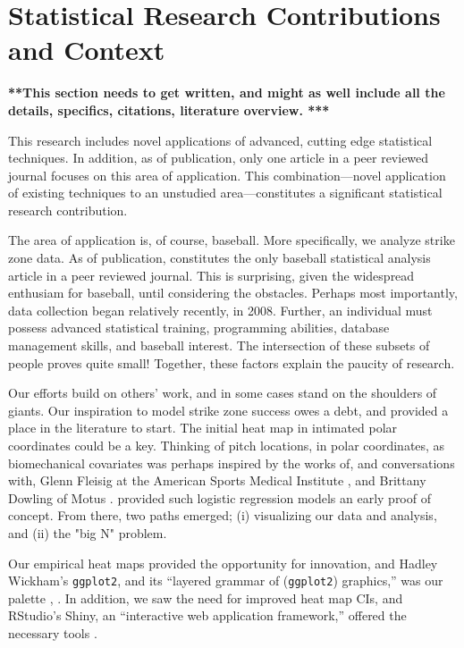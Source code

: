 \section{Statistical Research Contributions and Context}

{\bf ***This section needs to get written, and might as well include all the details, specifics, citations, literature overview. ***}

This research includes novel applications of advanced, cutting edge statistical techniques. In addition, as of publication, only one article in a peer reviewed journal focuses on this area of application. This combination---novel application of existing techniques to an unstudied area---constitutes a significant statistical research contribution. 

The area of application is, of course, baseball. More specifically, we analyze strike zone data. As of publication, \cite{Cross2015} constitutes the only baseball statistical analysis article in a peer reviewed journal. This is surprising, given the widespread enthusiam for baseball, until considering the obstacles. Perhaps most importantly, data collection began relatively recently, in 2008. Further, an individual must possess advanced statistical training, programming abilities, database management skills, and baseball interest. The intersection of these subsets of people proves quite small!  Together, these factors explain the paucity of research.

Our efforts build on others' work, and in some cases stand on the shoulders of giants. Our inspiration to model strike zone success owes \cite{Williams1971} a debt, and \cite{Cross2015} provided a place in the literature to start. The initial heat map in \cite{Cross2015} intimated polar coordinates could be a key. Thinking of pitch locations, in polar coordinates, as biomechanical covariates was perhaps inspired by the works of, and conversations with, Glenn Fleisig at the American Sports Medical Institute \citep{Fleisig2002}, and Brittany Dowling of Motus \citep{Dowling2016}. \cite{Hosmer2013} provided such logistic regression models an early proof of concept. From there, two  paths emerged; (i) visualizing our data and analysis, and (ii) the "big N" problem.

Our empirical heat maps provided the opportunity for innovation, and Hadley Wickham's \verb|ggplot2|, and its ``layered grammar of (\verb|ggplot2|) graphics,'' was our palette \citep{Wickham2009}, \citep{Wickham2010}. In addition, we saw the need for improved heat map CIs, and RStudio's Shiny, an ``interactive web application framework,'' offered the necessary tools \citep{Shiny}.

